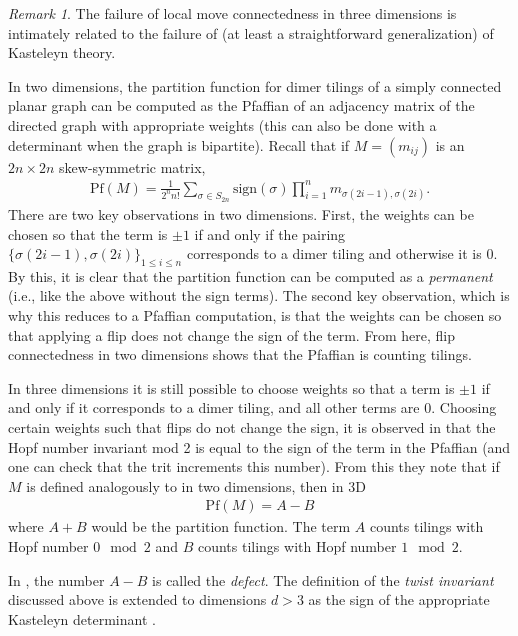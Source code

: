 \documentclass[11pt]{article}
\theoremstyle{remark}
\newtheorem{rem}[thm]{Remark}
\theoremstyle{definition}
\begin{document}
\begin{rem}
The failure of local move connectedness in three dimensions is intimately related to the failure of (at least a straightforward generalization) of Kasteleyn theory. 

In two dimensions, the partition function for dimer tilings of a simply connected planar graph can be computed as the Pfaffian of an adjacency matrix of the directed graph with appropriate weights (this can also be done with a determinant when the graph is bipartite). Recall that if $M = (m_{ij})$ is an $2n\times 2n$ skew-symmetric matrix, 
\begin{align*}
    \text{Pf}(M) = \frac{1}{2^n n!}\sum_{\sigma\in S_{2n}} \text{sign}(\sigma) \prod_{i=1}^n m_{\sigma(2i-1),\sigma(2i)}.
\end{align*}
There are two key observations in two dimensions. First, the weights can be chosen so that the term is $\pm 1$ if and only if the pairing $\{\sigma(2i-1),\sigma(2i)\}_{1\leq i \leq n} $ corresponds to a dimer tiling and otherwise it is $0$. By this, it is clear that the partition function can be computed as a \textit{permanent} (i.e., like the above without the sign terms). The second key observation, which is why this reduces to a Pfaffian computation, is that the weights can be chosen so that applying a flip does not change the sign of the term. From here, flip connectedness in two dimensions shows that the Pfaffian is counting tilings. 

In three dimensions it is still possible to choose weights so that a term is $\pm 1$ if and only if it corresponds to a dimer tiling, and all other terms are $0$. Choosing certain weights such that flips do not change the sign, it is observed in \cite{freedman2011weakly} that the Hopf number invariant mod 2 is equal to the sign of the term in the Pfaffian (and one can check that the trit increments this number). From this they note that if $M$ is defined analogously to in two dimensions, then in 3D
\begin{align*}
    \text{Pf}(M) = A - B
\end{align*}
where $A + B$ would be the partition function. The term $A$ counts tilings with Hopf number $0\mod 2$ and $B$ counts tilings with Hopf number $1\mod 2$. 

In \cite{klivans2020domino}, the number $A-B$ is called the \textit{defect}. The definition of the \textit{twist invariant} discussed above is extended to dimensions $d>3$ as the sign of the appropriate Kasteleyn determinant \cite[Definition 3.1]{klivans2020domino}.


\end{rem}
\end{document}
